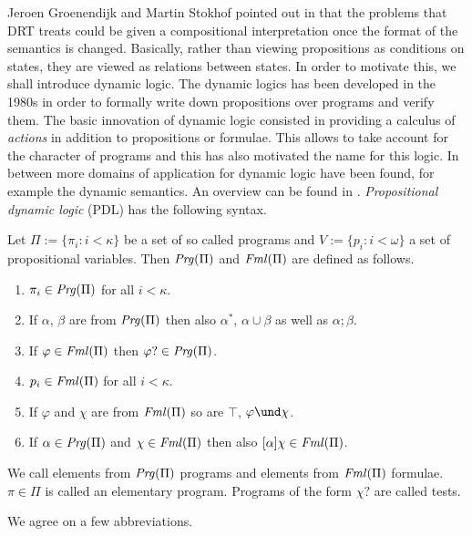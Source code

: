 Jeroen Groenendijk and Martin Stokhof pointed out in
 that the problems that DRT treats
could be given a compositional interpretation once the format of
the semantics is changed. Basically, rather than viewing
propositions as conditions on states, they are viewed as relations
between states. In order to motivate this, we shall introduce
dynamic logic. The dynamic logics has been developed in the 1980s
in order to formally write down propositions over programs and
verify them. The basic innovation of dynamic logic consisted in
providing a calculus of {\it actions\/} in addition to
propositions or formulae. This allows to take account for the
character of programs and this has also motivated the name for
this logic. In between more domains of application for dynamic
logic have been found, for example the dynamic semantics. An
overview can be found in \cite{muskensvanbenthemvisser:dynamics}. 
{\it Propositional dynamic logic\/} ({\sf PDL}) has the following 
syntax.
\begin{defn}
Let $\Pi := \{\pi_i : i < \kappa\}$ be a set of so called
programs and $V := \{p_i : i < \omega\}$ a set of propositional
variables. Then $\mbox{\it Prg\/}(\Pi)$ and $\mbox{\it Fml\/}(\Pi)$
are defined as follows.
\begin{enumerate}
\item
$\pi_i \in \mbox{\it Prg\/}(\Pi)$ for all $i < \kappa$.
\item
If $\alpha$, $\beta$ are from $\mbox{\it Prg\/}(\Pi)$ then also
$\alpha^{\ast}$, $\alpha \cup \beta$ as well as $\alpha;\beta$.
\item
If $\varphi \in \mbox{\it Fml\/}(\Pi)$ then
$\varphi? \in \mbox{\it Prg\/}(\Pi)$.
\item
$p_i \in \mbox{\it Fml\/}(\Pi)$ for all $i < \kappa$.
\item
If $\varphi$ and $\chi$ are from $\mbox{\it Fml\/}(\Pi)$ so
are $\top$, $\varphi \und \chi$.
\item
If $\alpha \in \mbox{\it Prg\/}(\Pi)$ and $\chi
    \in \mbox{\it Fml\/}(\Pi)$ then also
    $[\alpha] \chi \in \mbox{\it Fml\/}(\Pi)$.
\end{enumerate}
We call elements from $\mbox{\it Prg\/}(\Pi)$ {\bmi programs} and
elements from $\mbox{\it Fml\/}(\Pi)$ {\bmi formulae}. $\pi \in \Pi$
is called an {\bmi elementary program}. Programs of the form
$\chi?$ are called {\bmi tests}.
\end{defn}
We agree on a few abbreviations.
